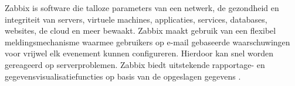 Zabbix is software die talloze parameters van een netwerk, de gezondheid en integriteit van servers, virtuele machines, applicaties, services, databases, websites, de cloud en meer bewaakt. Zabbix maakt gebruik van een flexibel meldingsmechanisme waarmee gebruikers op e-mail gebaseerde waarschuwingen voor vrijwel elk evenement kunnen configureren. Hierdoor kan snel worden gereageerd op serverproblemen. Zabbix biedt uitstekende rapportage- en gegevensvisualisatiefuncties op basis van de opgeslagen gegevens \autocite{Zabbix}. 















